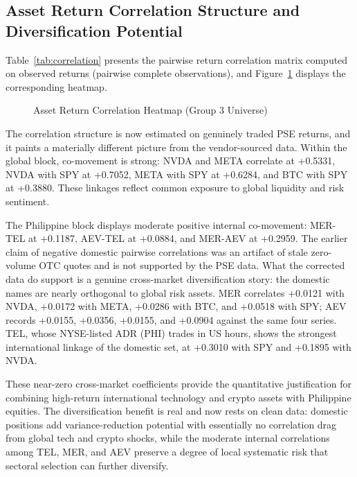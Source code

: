 \subsection{Asset Return Correlation Structure and Diversification Potential}

Table~\ref{tab:correlation} presents the pairwise return correlation matrix computed on observed returns (pairwise complete observations), and Figure~\ref{fig:correlation_heatmap} displays the corresponding heatmap.



\begin{figure}[H]
  \centering
  \caption{Asset Return Correlation Heatmap (Group 3 Universe)}
  \label{fig:correlation_heatmap}
\end{figure}

The correlation structure is now estimated on genuinely traded PSE returns, and it paints a materially different picture from the vendor-sourced data. Within the global block, co-movement is strong: NVDA and META correlate at +0.5331, NVDA with SPY at +0.7052, META with SPY at +0.6284, and BTC with SPY at +0.3880. These linkages reflect common exposure to global liquidity and risk sentiment.

The Philippine block displays moderate positive internal co-movement: MER-TEL at +0.1187, AEV-TEL at +0.0884, and MER-AEV at +0.2959. The earlier claim of negative domestic pairwise correlations was an artifact of stale zero-volume OTC quotes and is not supported by the PSE data. What the corrected data do support is a genuine cross-market diversification story: the domestic names are nearly orthogonal to global risk assets. MER correlates +0.0121 with NVDA, +0.0172 with META, +0.0286 with BTC, and +0.0518 with SPY; AEV records +0.0155, +0.0356, +0.0155, and +0.0904 against the same four series. TEL, whose NYSE-listed ADR (PHI) trades in US hours, shows the strongest international linkage of the domestic set, at +0.3010 with SPY and +0.1895 with NVDA.

These near-zero cross-market coefficients provide the quantitative justification for combining high-return international technology and crypto assets with Philippine equities. The diversification benefit is real and now rests on clean data: domestic positions add variance-reduction potential with essentially no correlation drag from global tech and crypto shocks, while the moderate internal correlations among TEL, MER, and AEV preserve a degree of local systematic risk that sectoral selection can further diversify.
